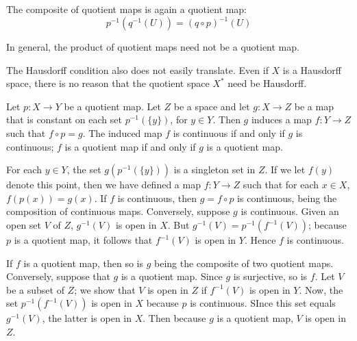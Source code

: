 \documentclass[12pt, a4paper, twoside, openright, titlepage]{book}
\begin{document}
\begin{rmk}{}{}
    The composite of quotient maps is again a quotient map: \begin{equation*}
        p^{-1}(q^{-1}(U)) = (q\circ p)^{-1}(U)
    \end{equation*}
\end{rmk}

In general, the product of quotient maps need not be a quotient map.

\begin{rmk}{}{}
    The Hausdorff condition also does not easily translate. Even if $X$ is a Hausdorff space, there is no reason that the quotient space $X^*$ need be Hausdorff.
\end{rmk}


\begin{thm}{}{}
    Let $p:X\rightarrow Y$ be a quotient map. Let $Z$ be a space and let $g:X\rightarrow Z$ be a map that is constant on each set $p^{-1}(\{y\})$, for $y \in Y$. Then $g$ induces a map $f:Y\rightarrow Z$ such that $f\circ p = g$. The induced map $f$ is continuous if and only if $g$ is continuous; $f$ is a quotient map if and only if $g$ is a quotient map.
    \begin{center}
    \end{center}
\end{thm}
\begin{proof*}{}{}
    For each $y \in Y$, the set $g(p^{-1}(\{y\}))$ is a singleton set in $Z$. If we let $f(y)$ denote this point, then we have defined a map $f:Y\rightarrow Z$ such that for each $x \in X$, $f(p(x)) = g(x)$. If $f$ is continuous, then $g = f\circ p$ is continuous, being the composition of continuous maps. Conversely, suppose $g$ is continuous. Given an open set $V$ of $Z$, $g^{-1}(V)$ is open in $X$. But $g^{-1}(V) = p^{-1}(f^{-1}(V))$; because $p$ is a quotient map, it follows that $f^{-1}(V)$ is open in $Y$. Hence $f$ is continuous.

    If $f$ is a quotient map, then so is $g$ being the composite of two quotient maps. Conversely, suppose that $g$ is a quotient map. Since $g$ is surjective, so is $f$. Let $V$ be a subset of $Z$; we show that $V$ is open in $Z$ if $f^{-1}(V)$ is open in $Y$. Now, the set $p^{-1}(f^{-1}(V))$ is open in $X$ because $p$ is continuous. SInce this set equals $g^{-1}(V)$, the latter is open in $X$. Then because $g$ is a quotient map, $V$ is open in $Z$.
\end{proof*}
\end{document}
